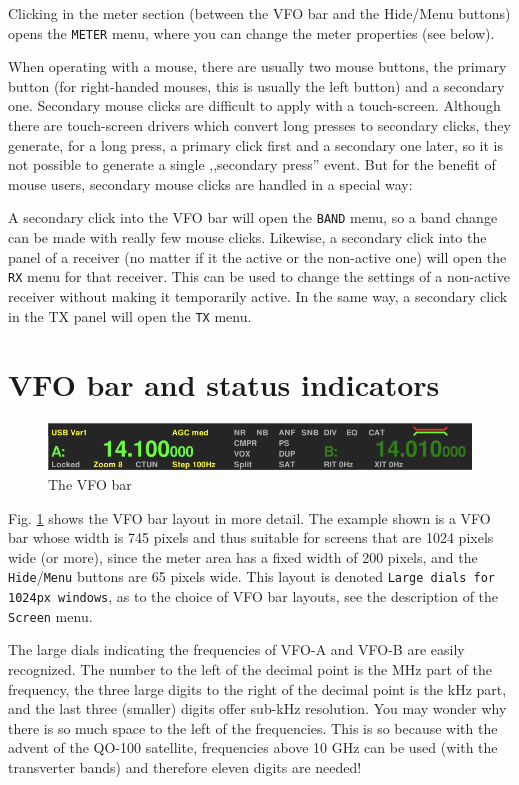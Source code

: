 \documentclass[12pt]{book}
\def\rett#1{\texttt{\color{red}#1}}
\def\bltt#1{\texttt{\color{blue}#1}}
\begin{document}
Clicking in the meter section (between the VFO bar and the
Hide/Menu buttons) opens the \bltt{METER} menu, where
you can change the meter properties (see below).

When operating with a mouse, there are usually two mouse buttons,
the primary button (for right-handed mouses, this is usually
the left button) and a secondary one. Secondary mouse clicks
are difficult to apply with a touch-screen. Although there are
touch-screen drivers which convert long presses to secondary clicks,
they generate, for a long press, a primary click first and a
secondary one later, so it is not possible to generate a
single ,,secondary press'' event. But for the benefit of
mouse users, secondary mouse clicks are handled in a special way:

A secondary click into the VFO bar will open the \bltt{BAND} menu,
so a band change can be made with really few mouse clicks. Likewise,
a secondary click into the panel of a receiver (no matter if it
the active or the non-active one) will open the \bltt{RX} menu
for that receiver. This can be used to change the settings of a
non-active receiver without making it temporarily active. In the
same way, a secondary click in the TX panel will open the
\bltt{TX} menu.

\section{VFO bar and status  indicators}
\label{sec:VFObar}
\begin{figure}[ht]
\center
\includegraphics[width=12cm]{VFObar.png}
\caption{The VFO bar}
\label{fig:VFObar}
\end{figure}

Fig. \ref{fig:VFObar} shows the VFO bar layout in more  detail.
The example shown is a VFO bar whose width is 745 pixels and
thus suitable for screens that are 1024 pixels wide (or more),
since the meter area has a fixed width of 200 pixels, and
the \rett{Hide}/\rett{Menu} buttons are 65 pixels wide. This layout is
denoted \texttt{Large dials for 1024px windows}, as to the choice
of VFO bar layouts, see the description of the \bltt{Screen} menu.

The large dials indicating the frequencies of VFO-A and VFO-B
are easily recognized. The number to the left of the decimal
point is the MHz part of the frequency, the three  large digits
to the right  of  the decimal point is the kHz part, and
the last three (smaller) digits offer sub-kHz resolution.
You may wonder why there is  so much space to the left of
the frequencies. This is so because with the advent of
the QO-100 satellite, frequencies above 10 GHz can be
used (with the transverter bands) and therefore eleven
digits are needed!
\end{document}
